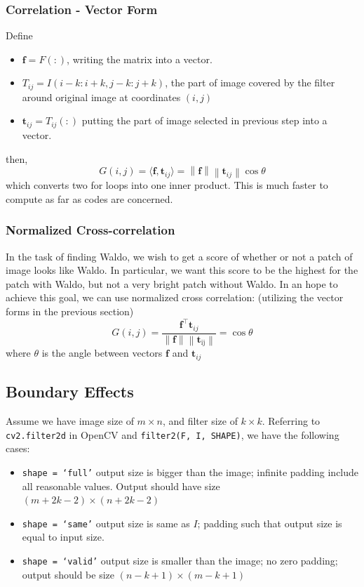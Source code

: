 \documentclass[11pt]{article}
\renewcommand{\bf}{\mathbf{f}}
\newcommand{\bt}{\mathbf{t}}
\newcommand{\norm}[1]{\left\lVert#1\right\rVert}
\begin{document}
\subsubsection{Correlation - Vector Form}
Define 
\begin{itemize}
	\item $\bf = F(:)$, writing the matrix into a vector.
	\item $T_{i j}=I(i-k: i+k, j-k: j+k)$, the part of image covered by the filter around original image at coordinates $(i, j)$
	\item $\mathbf{t}_{i j}=T_{i j}(:)$ putting the part of image selected in previous step into a vector. 
\end{itemize}
then, 
\begin{equation}
	G(i, j)= \langle \mathbf{f}, \mathbf{t}_{i j}\rangle = \norm{\bf}\norm{\bt_{ij}}\cos \theta
\end{equation}
which converts two for loops into one inner product. This is much faster to compute as far as codes are concerned. 

\subsubsection{Normalized Cross-correlation}
In the task of finding Waldo, we wish to get a score of whether or not a patch of image looks like Waldo. In particular, we want this score to be the highest for the patch with Waldo, but not a very bright patch without Waldo. In an hope to achieve this goal, we can use normalized cross correlation: (utilizing the vector forms in the previous section)
\begin{equation}
	G(i, j)=\frac{\mathbf{f}^\top \mathbf{t}_{i j}}{\|\mathbf{f}\|\left\|\mathbf{t}_{\mathrm{ij}}\right\|} = \cos \theta
\end{equation}
where $\theta$ is the angle between vectors $\bf$ and $\bt_{ij}$

\subsection{Boundary Effects}
Assume we have image size of $m \times n$, and filter size of $k \times k$. Referring to \texttt{cv2.filter2d} in OpenCV and \texttt{filter2(F, I, SHAPE)}, we have the following cases: 
\begin{itemize}
	\item \texttt{shape = `full'} output size is bigger than the image; infinite padding include all reasonable values. Output should have size $(m + 2k - 2) \times ( n + 2k - 2)$
	\item \texttt{shape = `same'} output size is same as $I$; padding such that output size is equal to input size. 
	\item \texttt{shape = `valid'} output size is smaller than the image; no zero padding; output should be size $(n - k + 1) \times (m - k + 1) $
\end{itemize}
\end{document}
